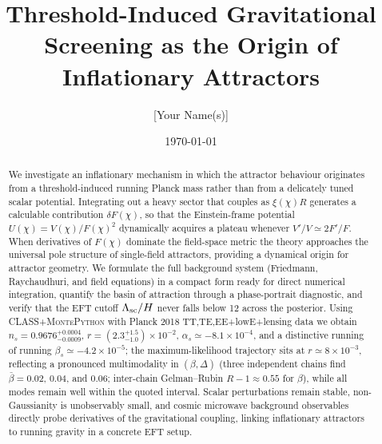 \documentclass[11pt,a4paper]{article}
\title{Threshold-Induced Gravitational Screening as the Origin of Inflationary Attractors}
\author{[Your Name(s)]}
\date{\today}
\begin{document}
\maketitle

\begin{abstract}
We investigate an inflationary mechanism in which the attractor behaviour originates from a threshold-induced running Planck mass rather than from a delicately tuned scalar potential. Integrating out a heavy sector that couples as $\xi(\chi) R$ generates a calculable contribution $\delta F(\chi)$, so that the Einstein-frame potential $U(\chi)=V(\chi)/F(\chi)^2$ dynamically acquires a plateau whenever $V'/V\simeq2F'/F$. When derivatives of $F(\chi)$ dominate the field-space metric the theory approaches the universal pole structure of single-field attractors, providing a dynamical origin for attractor geometry. We formulate the full background system (Friedmann, Raychaudhuri, and field equations) in a compact form ready for direct numerical integration, quantify the basin of attraction through a phase-portrait diagnostic, and verify that the EFT cutoff $\Lambda_{\rm sc}/H$ never falls below 12 across the posterior. Using \textsc{CLASS}+\textsc{MontePython} with Planck 2018 TT,TE,EE+lowE+lensing data we obtain $n_s=0.9676^{+0.0004}_{-0.0009}$, $r=(2.3^{+1.5}_{-1.0})\times10^{-2}$, $\alpha_s\simeq-8.1\times10^{-4}$, and a distinctive running of running $\beta_s\simeq-4.2\times10^{-5}$; the maximum-likelihood trajectory sits at $r\simeq8\times10^{-3}$, reflecting a pronounced multimodality in $(\beta,\Delta)$ (three independent chains find $\bar\beta=0.02$, $0.04$, and $0.06$; inter-chain Gelman--Rubin $R{-}1\approx0.55$ for $\beta$), while all modes remain well within the quoted interval. Scalar perturbations remain stable, non-Gaussianity is unobservably small, and cosmic microwave background observables directly probe derivatives of the gravitational coupling, linking inflationary attractors to running gravity in a concrete EFT setup.
\end{abstract}
\end{document}
